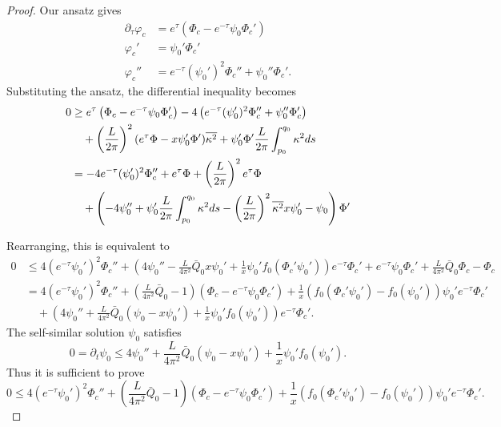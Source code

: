 \documentclass[a4paper, 12pt]{amsart}
\begin{document}
\begin{proof}
Our ansatz gives
\begin{align*}
\partial_{\tau} \varphi_c &= e^{\tau} \left(\Phi_c - e^{-\tau} \psi_0 \Phi_c'\right) \\
\varphi_c' &= \psi_0' \Phi_c' \\
\varphi_c'' &= e^{-\tau} (\psi_0')^2 \Phi_c'' + \psi_0'' \Phi_c'.
\end{align*}
Substituting the ansatz, the differential inequality becomes
\[
\begin{split}
0 &\geq e^{\tau} \left(\Phi_c - e^{-\tau} \psi_0 \Phi_c'\right) - 4\left(e^{-\tau} (\psi_0')^2 \Phi_c'' + \psi_0'' \Phi_c'\right) \\
&\quad + \left(\frac{L}{2\pi}\right)^2 (e^{\tau} \Phi - x \psi_0'\Phi') \overline{{\kappa^2}} + \psi_0'\Phi' \frac{L}{2\pi} \int_{p_0}^{q_0} \kappa^2 ds \\
&= - 4 e^{-\tau} (\psi_0')^2 \Phi_c'' + e^{\tau} \Phi + \left(\frac{L}{2\pi}\right)^2 e^{\tau} \Phi \\
&\quad + \left(-4 \psi_0'' + \psi_0' \frac{L}{2\pi}\int_{p_0}^{q_0} \kappa^2 ds - \left(\frac{L}{2\pi}\right)^2 \overline{{\kappa^2}} x\psi_0' - \psi_0\right) \Phi'
\end{split}
\]



Rearranging, this is equivalent to
\[
\begin{split}
0 &\leq 4 (e^{-\tau} \psi_0')^2 \Phi_c'' + \left(4\psi_0'' - \frac{L}{4\pi^2} \bar{Q}_0 x \psi_0' + \frac{1}{x} \psi_0'f_0(\Phi_c' \psi_0') \right) e^{-\tau} \Phi_c' + e^{-\tau} \psi_0 \Phi_c' + \frac{L}{4\pi^2} \bar{Q}_0 \Phi_c - \Phi_c \\
&= 4 (e^{-\tau} \psi_0')^2 \Phi_c'' + \left(\frac{L}{4\pi^2} \bar{Q}_0 - 1\right) \left(\Phi_c - e^{-\tau} \psi_0 \Phi_c'\right) + \frac{1}{x} \left(f_0(\Phi_c' \psi_0') - f_0(\psi_0')\right) \psi_0' e^{-\tau} \Phi_c'\\
&\quad + \left(4\psi_0'' + \frac{L}{4\pi^2} \bar{Q}_0 (\psi_0 - x \psi_0') + \frac{1}{x} \psi_0' f_0(\psi_0')\right) e^{-\tau} \Phi_c'.
\end{split}
\]
The self-similar solution $\psi_0$ satisfies
\[
0 = \partial_t \psi_0 \leq 4\psi_0'' + \frac{L}{4\pi^2} \bar{Q}_0 (\psi_0 - x \psi_0') + \frac{1}{x} \psi_0' f_0(\psi_0').
\]
Thus it is sufficient to prove
\[
0 \leq 4 (e^{-\tau} \psi_0')^2 \Phi_c'' + \left(\frac{L}{4\pi^2} \bar{Q}_0 - 1\right) \left(\Phi_c - e^{-\tau} \psi_0 \Phi_c'\right) + \frac{1}{x} \left(f_0(\Phi_c' \psi_0') - f_0(\psi_0')\right) \psi_0' e^{-\tau} \Phi_c'.
\]


\end{proof}
\end{document}
